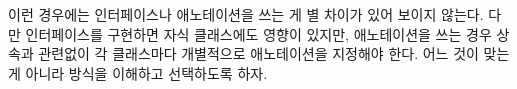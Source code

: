 이런 경우에는 인터페이스나 애노테이션을 쓰는 게 별 차이가 있어 보이지 않는다. 다만 인터페이스를 구현하면 자식 클래스에도 영향이 있지만, 애노테이션을 쓰는 경우 상속과 관련없이 각 클래스마다 개별적으로 애노테이션을 지정해야 한다. 어느 것이 맞는 게 아니라 방식을 이해하고 선택하도록 하자.

\begin{comment}
\subsection{EnumSet 또는 bit flag 사용}
오버라이딩할 필요가 있는데 속성의 수도 많아 메서드를 수십 개 만들어야 하는 상황이라면 EnumSet을 활용할 수도 있다.

\begin{lstlisting}[frame=single]  
    @Override 
    protected EnumSet<Attr> getAttributes() { 
        return EnumSet.of(Attr.A, Attr.B, Attr.D);
    }

\end{lstlisting}

상위 클래스에서 다음과 같이 쓴다. 
\begin{lstlisting}[frame=single] 
	EnumSet<Attr> enumSet = getAttributes();
  	if (enumSet.contains(Attr.A)) { 
  		someOperationW();
  	} 
\end{lstlisting}
 
EnumSet과 유사한 방식으로 bit field를 사용할 수도 있다. Effective Java Item 32에는 bit field 보다는 EnumSet을 쓰라고 나오지만, bit field도 안드로이드에서 많이 쓰이는 방식이다.\footnote{안드로이드에서는 퍼포먼스 이슈 때문에 Enum보다는 int 상수를 쓰라는 가이드가 아직 남아있다. Effective Java와 상충되는 여러 가지 가이드가 있지만, 갈수록 고려할 내용에서 줄어들고 있다.}

\subsubsection{하위 클래스에서 boolean 리턴 메서드 오버라이드}
boolean을 리턴하는 메서드를 쓰는 것도 비슷하긴 하다.
 
부모 클래스에서 아래와 같이 사용한다.
	
\begin{lstlisting}[frame=single] 
	public void execute() {
		if (isAttribute1()) {
 			someOperationW();
		}
		...
	}
 
	protected boolean isAttribute1() {
		return false;
	}
\end{lstlisting}
 
하위 클래스에서 isAttributeA() 메서드를 필요할 때 오버라이드 하는 방식이다.
나도 이 방법을 쓰는 경우가 있긴 한데, marker interface는 좀 더 복잡한 케이스에 더 맞는다.\\


\end{comment}
